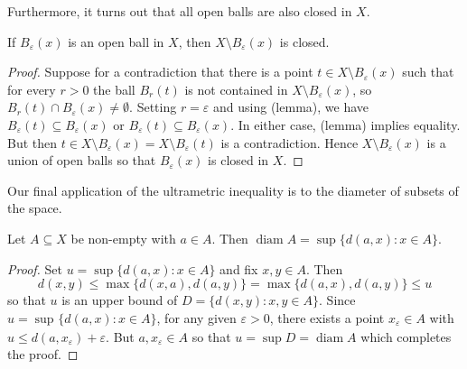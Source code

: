 Furthermore, it turns out that all open balls are also closed in \( X \).
\begin{lemma}
If \( B_{\varepsilon } (x) \) is an open ball in \( X \), then \( X \setminus  B_{\varepsilon } (x) \) is closed.
\end{lemma}
\begin{proof}
Suppose for a contradiction that there is a point \( t \in X \setminus B_{\varepsilon} (x) \) such that for every \( r > 0 \) the ball \( B_{r}(t) \) is not contained in \( X \setminus B_{\varepsilon } (x) \), so \( B_{r} (t) \cap B_{\varepsilon} (x) \neq \emptyset \). Setting \( r = \varepsilon  \) and using (lemma), we have \( B_{\varepsilon} (t) \subseteq B_{\varepsilon } (x) \) or \( B_{\varepsilon} (t) \subseteq B_{\varepsilon} (x) \). In either case, (lemma) implies equality. But then \( t \in X \setminus B_{\varepsilon } (x) = X \setminus B_{\varepsilon } (t) \) is a contradiction. Hence \( X \setminus B_{\varepsilon } (x) \) is a union of open balls so that \( B_{\varepsilon } (x) \) is closed in \( X \).
\end{proof}
Our final application of the ultrametric inequality is to the diameter of subsets of the space.
\begin{lemma}
Let \( A \subseteq X \) be non-empty with \( a \in A \). Then \( \operatorname{diam} A = \sup \{ d(a, x) : x \in A \}   \).
\end{lemma}
\begin{proof}
	Set \( u = \sup \{ d(a,x) : x \in A \}  \) and fix \( x,y \in A \). Then \[ d(x,y) \leq \max \{ d(x, a) , d(a, y) \} = \max \{ d(a,x), d(a,y) \} \leq u  \] so that \( u \) is an upper bound of \( D = \{ d(x,y) : x,y \in A \}  \). Since \( u = \sup_{} \{ d(a,x) : x \in A \}  \), for any given \( \varepsilon > 0 \), there exists a point \( x_{\varepsilon } \in A \) with \( u \leq d(a, x_{\varepsilon }) + \varepsilon   \). But \( a, x_{\varepsilon } \in A \) so that \( u = \sup D = \operatorname{diam} A \) which completes the proof.
\end{proof}
